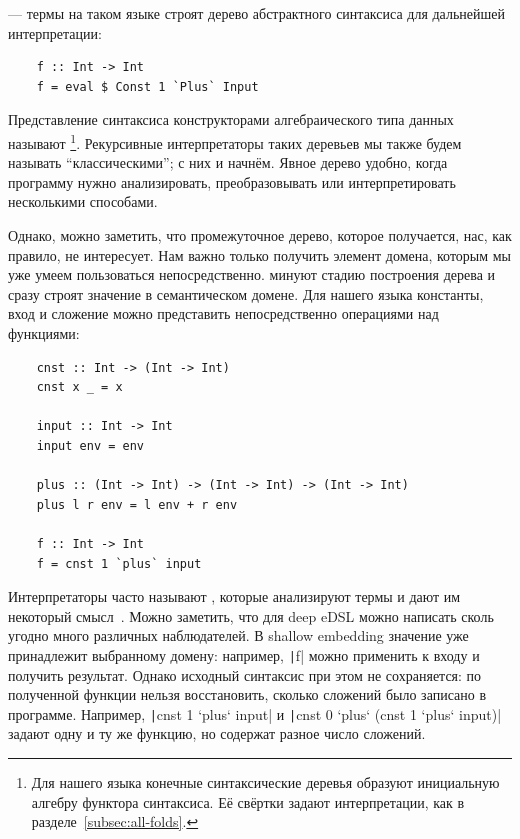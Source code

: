  --- термы на таком языке строят дерево абстрактного синтаксиса для дальнейшей интерпретации:
\begin{verbatim}
    f :: Int -> Int
    f = eval $ Const 1 `Plus` Input
\end{verbatim}

Представление синтаксиса конструкторами алгебраического типа данных называют \footnote{Для нашего языка конечные синтаксические деревья образуют инициальную алгебру функтора синтаксиса. Её свёртки задают интерпретации, как в разделе~\ref{subsec:all-folds}.}.
Рекурсивные интерпретаторы таких деревьев мы также будем называть ``классическими''; с них и начнём.
Явное дерево удобно, когда программу нужно анализировать, преобразовывать или интерпретировать несколькими способами.

%

Однако, можно заметить, что промежуточное дерево, которое получается, нас, как правило, не интересует.
Нам важно только получить элемент домена, которым мы уже умеем пользоваться непосредственно.
 минуют стадию построения дерева и сразу строят значение в семантическом домене.
Для нашего языка константы, вход и сложение можно представить непосредственно операциями над функциями:
\begin{verbatim}
    cnst :: Int -> (Int -> Int)
    cnst x _ = x

    input :: Int -> Int
    input env = env

    plus :: (Int -> Int) -> (Int -> Int) -> (Int -> Int)
    plus l r env = l env + r env

    f :: Int -> Int
    f = cnst 1 `plus` input
\end{verbatim}

Интерпретаторы часто называют , которые анализируют термы и дают им некоторый смысл~\cite{gibbons2013functional}.
Можно заметить, что для deep eDSL можно написать сколь угодно много различных наблюдателей.
В shallow embedding значение уже принадлежит выбранному домену: например, \texttt|f| можно применить к входу и получить результат.
Однако исходный синтаксис при этом не сохраняется: по полученной функции нельзя восстановить, сколько сложений было записано в программе.
Например, \texttt|cnst 1 `plus` input| и \texttt|cnst 0 `plus` (cnst 1 `plus` input)| задают одну и ту же функцию, но содержат разное число сложений.

